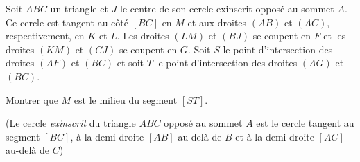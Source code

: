 Soit $ABC$ un triangle et $J$ le centre de son cercle exinscrit opposé au sommet $A$. Ce cercle est tangent au
côté $[BC]$ en $M$ et aux droites $(AB)$ et $(AC)$, respectivement, en $K$ et $L$. Les droites $(LM)$ et
$(BJ)$ se coupent en $F$ et les droites $(KM)$ et $(CJ)$ se coupent en $G$. Soit $S$ le point d'intersection
des droites $(AF)$ et $(BC)$ et soit $T$ le point d'intersection des droites $(AG)$ et $(BC)$.

Montrer que $M$ est le milieu du segment $[ST]$.

(Le cercle \emph{exinscrit} du triangle $ABC$ opposé au sommet $A$ est le cercle tangent au segment $[BC]$, à
la demi-droite $[AB]$ au-delà de $B$ et à la demi-droite $[AC]$ au-delà de $C$)
